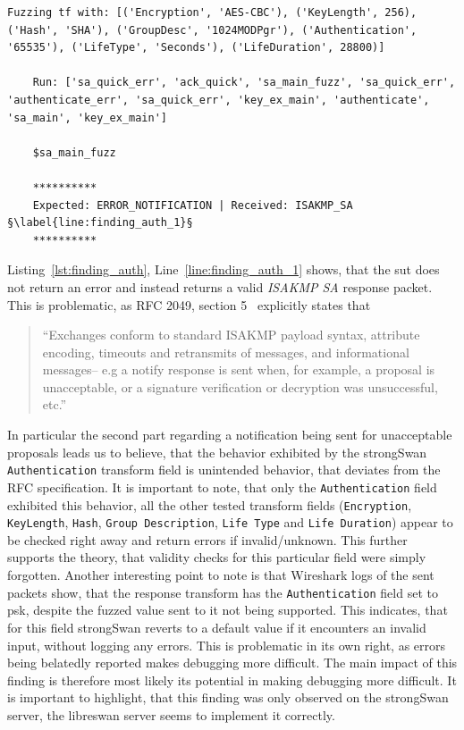 \begin{lstlisting}[float=h, caption=Discovered finding showing the Authentication field not being validated., label=lst:finding_auth, escapechar=§]
	Fuzzing tf with: [('Encryption', 'AES-CBC'), ('KeyLength', 256), ('Hash', 'SHA'), ('GroupDesc', '1024MODPgr'), ('Authentication', '65535'), ('LifeType', 'Seconds'), ('LifeDuration', 28800)]
	
	Run: ['sa_quick_err', 'ack_quick', 'sa_main_fuzz', 'sa_quick_err', 'authenticate_err', 'sa_quick_err', 'key_ex_main', 'authenticate', 'sa_main', 'key_ex_main']
	
	$sa_main_fuzz

	**********
	Expected: ERROR_NOTIFICATION | Received: ISAKMP_SA §\label{line:finding_auth_1}§
	**********
\end{lstlisting}

\newpage
Listing~\ref{lst:finding_auth}, Line~\ref{line:finding_auth_1} shows, that the \ac{sut} does not return an error and instead returns a valid \emph{ISAKMP SA} response packet. This is problematic, as RFC 2049, section 5~\cite{rfc:ikev1} explicitly states that 

\begin{quotation}
	``Exchanges conform to standard ISAKMP payload syntax, attribute
	encoding, timeouts and retransmits of messages, and informational
	messages-- e.g a notify response is sent when, for example, a
	proposal is unacceptable, or a signature verification or decryption
	was unsuccessful, etc.''
\end{quotation}

In particular the second part regarding a notification being sent for unacceptable proposals leads us to believe, that the behavior exhibited by the strongSwan \texttt{Authentication} transform field is unintended behavior, that deviates from the RFC specification. It is important to note, that only the \texttt{Authentication} field exhibited this behavior, all the other tested transform fields (\texttt{Encryption}, \texttt{KeyLength}, \texttt{Hash}, \texttt{Group Description}, \texttt{Life Type} and \texttt{Life Duration}) appear to be checked right away and return errors if invalid/unknown. This further supports the theory, that validity checks for this particular field were simply forgotten. Another interesting point to note is that Wireshark logs of the sent packets show, that the response transform has the \texttt{Authentication} field set to \ac{psk}, despite the fuzzed value sent to it not being supported. This indicates, that for this field strongSwan reverts to a default value if it encounters an invalid input, without logging any errors. This is problematic in its own right, as errors being belatedly reported makes debugging more difficult. The main impact of this finding is therefore most likely its potential in making debugging more difficult. It is important to highlight, that this finding was only observed on the strongSwan server, the libreswan server seems to implement it correctly. \\

